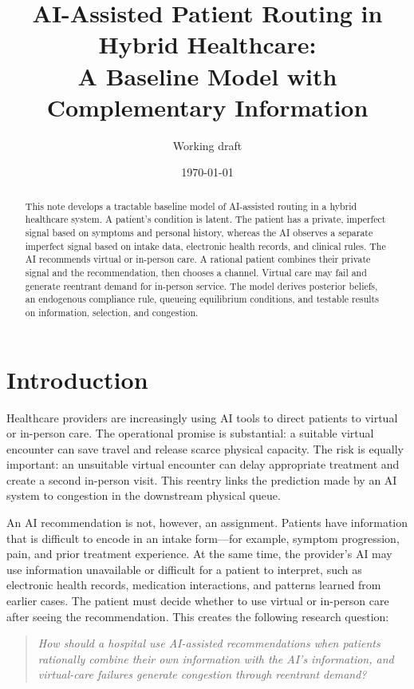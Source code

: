 \documentclass[11pt]{article}
\title{AI-Assisted Patient Routing in Hybrid Healthcare:\\A Baseline Model with Complementary Information}
\author{Working draft}
\date{\today}
\begin{document}
\maketitle

\begin{abstract}
This note develops a tractable baseline model of AI-assisted routing in a hybrid healthcare system.  A patient's condition is latent.  The patient has a private, imperfect signal based on symptoms and personal history, whereas the AI observes a separate imperfect signal based on intake data, electronic health records, and clinical rules.  The AI recommends virtual or in-person care.  A rational patient combines their private signal and the recommendation, then chooses a channel.  Virtual care may fail and generate reentrant demand for in-person service.  The model derives posterior beliefs, an endogenous compliance rule, queueing equilibrium conditions, and testable results on information, selection, and congestion.
\end{abstract}

\section{Introduction}

Healthcare providers are increasingly using AI tools to direct patients to virtual or in-person care.  The operational promise is substantial: a suitable virtual encounter can save travel and release scarce physical capacity.  The risk is equally important: an unsuitable virtual encounter can delay appropriate treatment and create a second in-person visit.  This reentry links the prediction made by an AI system to congestion in the downstream physical queue.

An AI recommendation is not, however, an assignment.  Patients have information that is difficult to encode in an intake form---for example, symptom progression, pain, and prior treatment experience.  At the same time, the provider's AI may use information unavailable or difficult for a patient to interpret, such as electronic health records, medication interactions, and patterns learned from earlier cases.  The patient must decide whether to use virtual or in-person care after seeing the recommendation.  This creates the following research question:
\begin{quote}
\emph{How should a hospital use AI-assisted recommendations when patients rationally combine their own information with the AI's information, and virtual-care failures generate congestion through reentrant demand?}
\end{quote}
\end{document}
